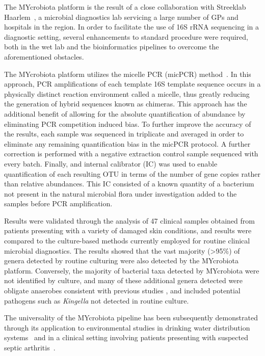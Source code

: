 The MYcrobiota platform is the result of a close collaboration with Streeklab Haarlem~\cite{url-streeklab}, a microbial diagnostics lab servicing a large number of GPs and hospitals in the region. In order to facilitate the use of 16S rRNA sequencing in a diagnostic setting, several enhancements to standard procedure were required, both in the wet lab and the bioinformatics pipelines to overcome the aforementioned obstacles.

The MYcrobiota platform utilizes the micelle PCR (micPCR) method~\cite{boers2015micelle,boers2017novel}. In this approach, PCR amplifications of each template 16S template sequence occurs in a physically distinct reaction environment called a micelle, thus greatly reducing the generation of hybrid sequences known as chimeras. This approach has the additional benefit of allowing for the absolute quantification of abundance by eliminating PCR competition induced bias. To further improve the accuracy of the results, each sample was sequenced in triplicate and averaged in order to eliminate any remaining quantification bias in the micPCR protocol. A further correction is performed with a negative extraction control sample sequenced with every batch. Finally, and internal calibrator (IC) was used to enable quantification of each resulting OTU in terms of the number of gene copies rather than relative abundances. This IC consisted of a known quantity of a bacterium not present in the natural microbial flora under investigation added to the samples before PCR amplification.

Results were validated through the analysis of 47 clinical samples obtained from patients presenting with a variety of damaged skin conditions, and results were compared to the culture-based methods currently employed for routine clinical microbial diagnostics. The results showed that the vast majority (>95\%) of genera detected by routine culturing were also detected by the MYcrobiota platform. Conversely, the majority of bacterial taxa detected by MYcrobiota were not identified by culture, and many of these additional genera detected were obligate anaerobes consistent with previous studies \cite{TODO}, and included potential pathogens such as \emph{Kingella} not detected in routine culture.

The universality of the MYcrobiota pipeline has been subsequently demonstrated through its application to environmental studies in drinking water distribution systems~\cite{boers2018monitoring} and in a clinical setting involving patients presenting with suspected septic arthritis~\cite{boers2018detection}.

